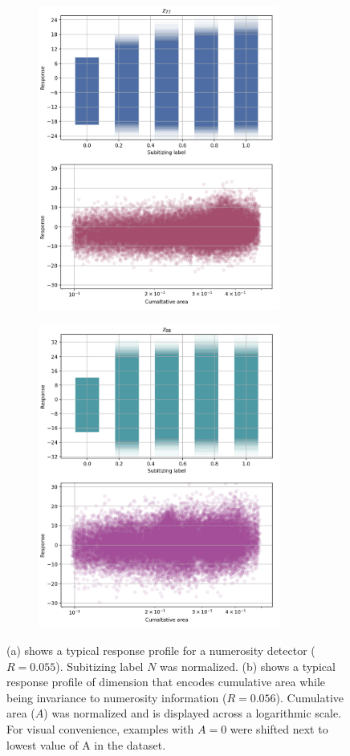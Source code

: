\documentclass[twocolumn]{article}
\begin{document}
{\begin{figure}[ht]
\centering
\begin{subfigure}{.5\textwidth}
  \centering
  \includegraphics[width=1.0\linewidth, height=10cm]{Nn-z77.png}
  \caption{}
  \label{fig:zn}
\end{subfigure}%
\begin{subfigure}{.5\textwidth}
  \centering
  \includegraphics[width=1.0\linewidth, height=10cm]{Na-z88.png}
   \caption{}
  \label{fig:za}
\end{subfigure}
\caption{(a) shows a typical response profile for a numerosity detector ($R=0.055$).  Subitizing label $N$ was normalized. (b) shows a typical response profile of dimension that encodes cumulative area while being invariance to numerosity information ($R=0.056$). Cumulative area ($A$) was normalized and is displayed across a logarithmic scale. For visual convenience, examples with $A=0$ were shifted next to lowest value of A in the dataset.}
\label{fig:linear}
\end{figure}
\newpage 
\hypertarget{conclusion}{%
}}
\end{document}
